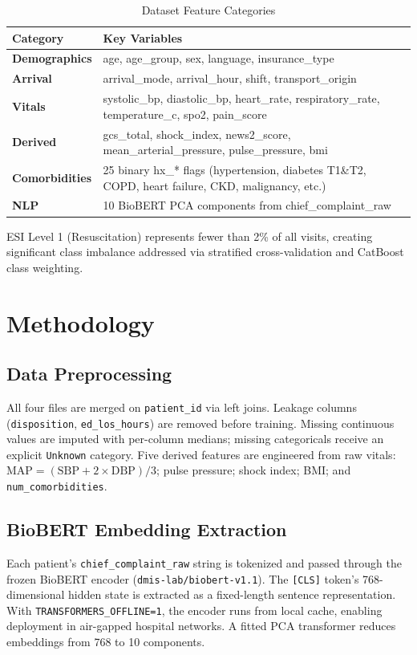 \documentclass[conference]{IEEEtran}
\begin{document}
\begin{table}[t]
\caption{Dataset Feature Categories}
\label{tab:features}
\renewcommand{\arraystretch}{1.2}
\begin{tabularx}{\columnwidth}{>{\bfseries}lX}
\toprule
Category & Key Variables \\
\midrule
Demographics & age, age\_group, sex, language, insurance\_type \\
Arrival & arrival\_mode, arrival\_hour, shift, transport\_origin \\
Vitals & systolic\_bp, diastolic\_bp, heart\_rate, respiratory\_rate, temperature\_c, spo2, pain\_score \\
Derived & gcs\_total, shock\_index, news2\_score, mean\_arterial\_pressure, pulse\_pressure, bmi \\
Comorbidities & 25 binary hx\_* flags (hypertension, diabetes T1\&T2, COPD, heart failure, CKD, malignancy, etc.) \\
NLP & 10 BioBERT PCA components from chief\_complaint\_raw \\
\bottomrule
\end{tabularx}
\end{table}

ESI Level 1 (Resuscitation) represents fewer than 2\% of all visits, creating significant class imbalance addressed via stratified cross-validation and CatBoost class weighting.

\section{Methodology}

\subsection{Data Preprocessing}
All four files are merged on \texttt{patient\_id} via left joins. Leakage columns (\texttt{disposition}, \texttt{ed\_los\_hours}) are removed before training. Missing continuous values are imputed with per-column medians; missing categoricals receive an explicit \texttt{Unknown} category. Five derived features are engineered from raw vitals: $\text{MAP} = (\text{SBP} + 2\times\text{DBP})/3$; pulse pressure; shock index; BMI; and \texttt{num\_comorbidities}.

\subsection{BioBERT Embedding Extraction}
Each patient's \texttt{chief\_complaint\_raw} string is tokenized and passed through the frozen BioBERT encoder (\texttt{dmis-lab/biobert-v1.1}). The \texttt{[CLS]} token's 768-dimensional hidden state is extracted as a fixed-length sentence representation. With \texttt{TRANSFORMERS\_OFFLINE=1}, the encoder runs from local cache, enabling deployment in air-gapped hospital networks. A fitted PCA transformer reduces embeddings from 768 to 10 components.
\end{document}
